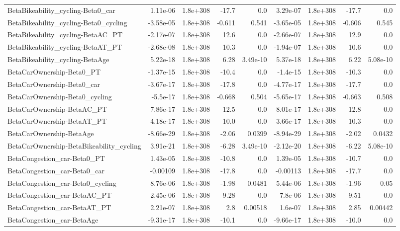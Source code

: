 \begin{tabular}{lrrrrrrrr}
BetaBikeability_cycling-Beta0_car & 1.11e-06 & 1.8e+308 & -17.7 & 0.0 & 3.29e-07 & 1.8e+308 & -17.7 & 0.0 \\
BetaBikeability_cycling-Beta0_cycling & -3.58e-05 & 1.8e+308 & -0.611 & 0.541 & -3.65e-05 & 1.8e+308 & -0.606 & 0.545 \\
BetaBikeability_cycling-BetaAC_PT & -2.17e-07 & 1.8e+308 & 12.6 & 0.0 & -2.66e-07 & 1.8e+308 & 12.9 & 0.0 \\
BetaBikeability_cycling-BetaAT_PT & -2.68e-08 & 1.8e+308 & 10.3 & 0.0 & -1.94e-07 & 1.8e+308 & 10.6 & 0.0 \\
BetaBikeability_cycling-BetaAge & 5.22e-18 & 1.8e+308 & 6.28 & 3.49e-10 & 5.37e-18 & 1.8e+308 & 6.22 & 5.08e-10 \\
BetaCarOwnership-Beta0_PT & -1.37e-15 & 1.8e+308 & -10.4 & 0.0 & -1.4e-15 & 1.8e+308 & -10.3 & 0.0 \\
BetaCarOwnership-Beta0_car & -3.67e-17 & 1.8e+308 & -17.8 & 0.0 & -4.77e-17 & 1.8e+308 & -17.7 & 0.0 \\
BetaCarOwnership-Beta0_cycling & -5.5e-17 & 1.8e+308 & -0.668 & 0.504 & -5.65e-17 & 1.8e+308 & -0.663 & 0.508 \\
BetaCarOwnership-BetaAC_PT & 7.86e-17 & 1.8e+308 & 12.5 & 0.0 & 8.01e-17 & 1.8e+308 & 12.8 & 0.0 \\
BetaCarOwnership-BetaAT_PT & 4.18e-17 & 1.8e+308 & 10.0 & 0.0 & 3.66e-17 & 1.8e+308 & 10.3 & 0.0 \\
BetaCarOwnership-BetaAge & -8.66e-29 & 1.8e+308 & -2.06 & 0.0399 & -8.94e-29 & 1.8e+308 & -2.02 & 0.0432 \\
BetaCarOwnership-BetaBikeability_cycling & 3.91e-21 & 1.8e+308 & -6.28 & 3.49e-10 & -2.12e-20 & 1.8e+308 & -6.22 & 5.08e-10 \\
BetaCongestion_car-Beta0_PT & 1.43e-05 & 1.8e+308 & -10.8 & 0.0 & 1.39e-05 & 1.8e+308 & -10.7 & 0.0 \\
BetaCongestion_car-Beta0_car & -0.00109 & 1.8e+308 & -17.8 & 0.0 & -0.00113 & 1.8e+308 & -17.7 & 0.0 \\
BetaCongestion_car-Beta0_cycling & 8.76e-06 & 1.8e+308 & -1.98 & 0.0481 & 5.44e-06 & 1.8e+308 & -1.96 & 0.05 \\
BetaCongestion_car-BetaAC_PT & 2.45e-06 & 1.8e+308 & 9.28 & 0.0 & 7.8e-06 & 1.8e+308 & 9.51 & 0.0 \\
BetaCongestion_car-BetaAT_PT & 2.21e-07 & 1.8e+308 & 2.8 & 0.00518 & 1.6e-07 & 1.8e+308 & 2.85 & 0.00442 \\
BetaCongestion_car-BetaAge & -9.31e-17 & 1.8e+308 & -10.1 & 0.0 & -9.66e-17 & 1.8e+308 & -10.0 & 0.0 \\

\end{tabular}
